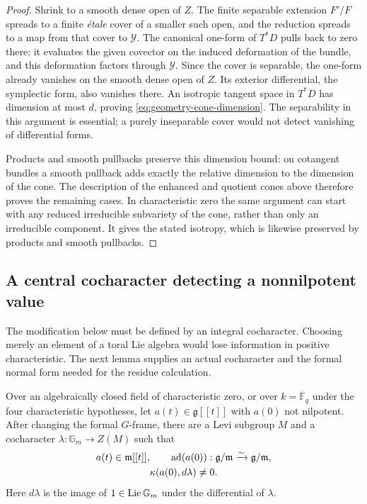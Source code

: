 \begin{proof}
Shrink to a smooth dense open of $Z$.  The finite separable extension
$F'/F$ spreads to a finite \emph{\'etale} cover of a smaller such open,
and the reduction spreads to a map from that cover to $\mathcal Y$.
The canonical one-form of $T^*D$ pulls back to zero there: it evaluates
the given covector on the induced deformation of the bundle, and this
deformation factors through $\mathcal Y$.  Since the cover is separable,
the one-form already vanishes on the smooth dense open of $Z$.
Its exterior differential, the symplectic form, also vanishes there.
An isotropic tangent space in $T^*D$ has dimension at most $d$, proving
\eqref{eq:geometry-cone-dimension}.  The separability in this argument
is essential; a purely inseparable cover would not detect vanishing
of differential forms.

Products and smooth pullbacks preserve this dimension bound: on
cotangent bundles a smooth pullback adds exactly the relative dimension
to the dimension of the cone.  The description of the enhanced and
quotient cones above therefore proves the remaining cases.  In
characteristic zero the same argument can start with any reduced
irreducible subvariety of the cone, rather than only an irreducible
component.  It gives the stated isotropy, which is likewise preserved
by products and smooth pullbacks.
\end{proof}

\subsection{A central cocharacter detecting a nonnilpotent value}

The modification below must be defined by an integral cocharacter.
Choosing merely an element of a toral Lie algebra would lose
information in positive characteristic.  The next lemma supplies an
actual cocharacter and the formal normal form needed for the residue
calculation.

\begin{lemma}\label{lem:central-cocharacter}
Over an algebraically closed field of characteristic zero, or over
$k=\overline{\mathbb F}_q$ under the four characteristic hypotheses,
let $a(t)\in\mathfrak g[[t]]$ with $a(0)$ not nilpotent.
After changing the formal $G$-frame, there are a Levi subgroup $M$ and
a cocharacter $\lambda:\mathbb G_m\to Z(M)$ such that
\begin{equation}\label{eq:geometry-levi-normal-form}
 \begin{gathered}
 a(t)\in\mathfrak m[[t]],\qquad
 \operatorname{ad}(a(0)):\mathfrak g/\mathfrak m\xrightarrow{\sim}
                                      \mathfrak g/\mathfrak m,\\
                         \kappa(a(0),d\lambda)\ne0.
 \end{gathered}
\end{equation}
Here $d\lambda$ is the image of $1\in\operatorname{Lie}\mathbb G_m$ under the
differential of $\lambda$.
\end{lemma}

